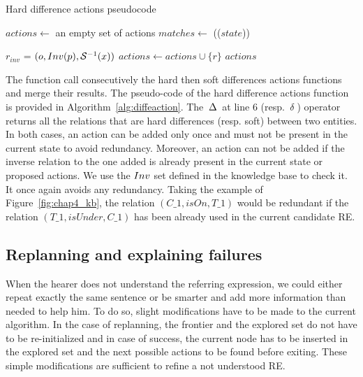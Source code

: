 \begin{algorithm}[htb!]
\caption{\label{alg:diffeaction} Hard difference actions pseudocode}
\begin{algorithmic}[1]
    \State $actions\leftarrow$ an empty set of actions
    \State $matches\leftarrow$ \sparqlresult(\toquery($state$))

                \State $r_{inv}$ = $(o, Inv(p), \mathcal{S}^{-1}(x))$
                    \State $\textit{actions} \gets \textit{actions} \cup \{r\}$
                \EndIf
            \EndFor
        \EndIf
    \EndFor
    \Return $actions$
\EndFunction
\end{algorithmic}
\end{algorithm}

The \differenceactions{} function call consecutively the hard then soft differences actions functions and merge their results. The pseudo-code of the hard difference actions function is provided in Algorithm~\ref{alg:diffeaction}. The $\,\Delta\,$ at line 6 (resp. $\,\delta\,$) operator returns all the relations that are hard differences (resp. soft) between two entities. In both cases, an action can be added only once and must not be present in the current state to avoid redundancy. Moreover, an action can not be added if the inverse relation to the one added is already present in the current state or proposed actions. We use the $Inv$ set defined in the knowledge base to check it. It once again avoids any redundancy. Taking the example of Figure~\ref{fig:chap4_kb}, the relation $(C\_1, isOn, T\_1)$ would be redundant if the relation $(T\_1, isUnder, C\_1)$ has been already used in the current candidate RE.

\subsection{Replanning and explaining failures}

When the hearer does not understand the referring expression, we could either repeat exactly the same sentence or be smarter and add more information than needed to help him. To do so, slight modifications have to be made to the current algorithm. In the case of replanning, the frontier and the explored set do not have to be re-initialized and in case of success, the current node has to be inserted in the explored set and the next possible actions to be found before exiting. These simple modifications are sufficient to refine a not understood RE.

